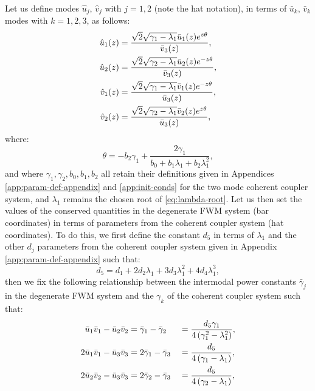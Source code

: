 \documentclass[11pt,a4paper]{article}
\numberwithin{equation}{section}
\begin{document}
Let us define modes $\hat{u}_j$, $\hat{v}_j$ with $j=1,2$ (note the hat notation), in terms of $\bar{u}_k$, $\bar{v}_k$ modes with $k=1,2,3$, as follows:
\begin{align}
  \hat{u}_1{\left(z\right)} &= \frac{\sqrt{2} \sqrt{{\gamma}_{1} - {\lambda}_{1}} \bar{u}_1{\left(z\right)} e^{z \theta}}{\bar{v}_3{\left(z\right)}}, \notag \\
  \hat{u}_2{\left(z\right)} &= \frac{\sqrt{2} \sqrt{{\gamma}_{2} - {\lambda}_{1}} \bar{u}_2{\left(z\right)} e^{-z \theta}}{\bar{v}_3{\left(z\right)}}, \notag \\
  \hat{v}_1{\left(z\right)} &= \frac{\sqrt{2} \sqrt{{\gamma}_{1} - {\lambda}_{1}} \bar{v}_1{\left(z\right)} e^{-z \theta}}{\bar{u}_3{\left(z\right)}}, \notag \\
  \hat{v}_2{\left(z\right)} &= \frac{\sqrt{2} \sqrt{{\gamma}_{2} - {\lambda}_{1}} \bar{v}_2{\left(z\right)} e^{z \theta}}{\bar{u}_3{\left(z\right)}}, \label{eq:projection-hat-as-bars}
\end{align}
where:
\begin{equation}
\theta = - {b}_{2} {\gamma}_{1} + \frac{2 {\gamma}_{1}}{{b}_{0} + {b}_{1} {\lambda}_{1} + {b}_{2} {\lambda}_{1}^{2}},
\end{equation}
and where $\gamma_1, \gamma_2, b_0, b_1, b_2$ all retain their definitions given in Appendices \ref{app:param-def-appendix} and \ref{app:init-conds} for the two mode coherent coupler system, and $\lambda_1$ remains the chosen root of \eqref{eq:lambda-root}.
Let us then set the values of the conserved quantities in the degenerate FWM system (bar coordinates) in terms of parameters from the coherent coupler system (hat coordinates). 
To do this, we first define the constant $d_5$ in terms of $\lambda_1$ and the other $d_j$ parameters from the coherent coupler system given in Appendix \ref{app:param-def-appendix} such that:
\begin{equation}
{d}_{5} = {d}_{1} + 2 {d}_{2} {\lambda}_{1} + 3 {d}_{3} {\lambda}_{1}^{2} + 4 {d}_{4} {\lambda}_{1}^{3},
\end{equation}
then we fix the following relationship between the intermodal power constants $\bar{\gamma}_j$ in the degenerate FWM system and the $\gamma_k$ of the coherent coupler system such that:
\begin{alignat}{2}
\bar{u}_1\bar{v}_1 - \bar{u}_2\bar{v}_2 &= \bar{\gamma}_1 - \bar{\gamma}_2 &&= \frac{{d}_{5} {\gamma}_{1}}{4 \left({\gamma}_{1}^{2} -  {\lambda}_{1}^{2}\right)}, \notag \\
2\bar{u}_1\bar{v}_1 - \bar{u}_3\bar{v}_3 &= 2\bar{\gamma}_1 - \bar{\gamma}_3 &&= \frac{d_5}{4\left(\gamma_1 - \lambda_1\right)}, \notag \\
2\bar{u}_2\bar{v}_2 - \bar{u}_3\bar{v}_3 &= 2\bar{\gamma}_2 - \bar{\gamma}_3 &&= \frac{d_5}{4\left(\gamma_2 - \lambda_1\right)},
\end{alignat}
\end{document}
